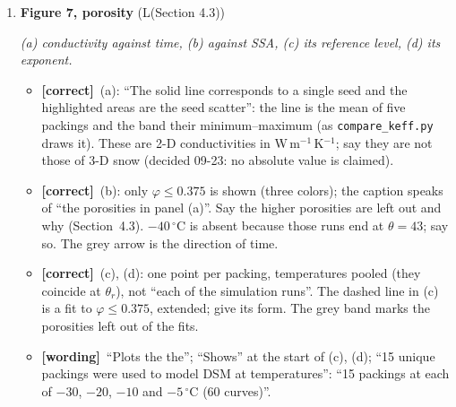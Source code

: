 \documentclass[11pt]{article}
\newcommand{\Pg}[3]{\item \textbf{#1} {\small(#2)}\par\textit{#3}}
\newcommand{\tC}{\textcolor{miss}{\textbf{[correct]}}\ }
\newcommand{\tG}{\textcolor{stale}{\textbf{[wording]}}\ }
\newcommand{\tA}{\textcolor{have}{\textbf{[add]}}\ }
\begin{document}
\begin{enumerate}
\begin{itemize}
    $0.34\times10^{-4}$. The factor $10^{-4}$ is missing from the caption.
  \item \tA Which packing (it appears to be the $\varphi = 0.325$ packing of
    Figure~5; say so) and that the frames are at $-20\,^{\circ}$C, at 0,
    10.2, 19.5 and 30.0 days.
  \item \tA Define $\theta = t/\tau_{\mathrm{sub}}$ and $\theta_r = 30$ (the
    dotted line). Say why the curves in (b) start at different values: each
    is normalized at $\theta_r$, which falls at a different time at each
    temperature.
  \item \tA (c), (d): the five curves overlie (within 0.3\%); that is the
    result, and the caption can say it. Axes start at $\theta = 1$
    (log scale).
  \item \tG ``preformed'' (performed); ``2.0mm'' (2.0~mm); ``The vertical
    axis is $k_{\mathrm{eff}}$, average value of $k_{xx}$ and $k_{yy}$, is
    normalized'': ``$k_{\mathrm{eff}} = (k_{xx}+k_{yy})/2$, normalized
    \ldots''. ``Shows the same curves plotted for'': ``(c) The same curves
    against''.
  \end{itemize}
\Pg{Figure 7, porosity}{L(Section 4.3)}{(a) conductivity against time, (b) against SSA, (c) its reference level, (d) its exponent.}
  \begin{itemize}
  \item \tC (a): ``The solid line corresponds to a single seed and the
    highlighted areas are the seed scatter'': the line is the mean of five
    packings and the band their minimum--maximum (as
    \texttt{compare\_keff.py} draws it).
    These are 2-D conductivities in W\,m$^{-1}$\,K$^{-1}$; say they are not
    those of 3-D snow (decided 09-23: no absolute value is claimed).
  \item \tC (b): only $\varphi \le 0.375$ is shown (three colors); the
    caption speaks of ``the porosities in panel (a)''. Say the higher
    porosities are left out and why (Section~4.3). $-40\,^{\circ}$C is
    absent because those runs end at $\theta = 43$; say so. The grey arrow
    is the direction of time.
  \item \tC (c), (d): one point per packing, temperatures pooled (they
    coincide at $\theta_r$), not ``each of the simulation runs''. The dashed
    line in (c) is a fit to $\varphi \le 0.375$, extended; give its form.
    The grey band marks the porosities left out of the fits.
  \item \tG ``Plots the the''; ``Shows'' at the start of (c), (d); ``15
    unique packings were used to model DSM at temperatures'': ``15 packings
    at each of $-30$, $-20$, $-10$ and $-5\,^{\circ}$C (60 curves)''.
  \end{itemize}
\end{enumerate}
\end{document}
